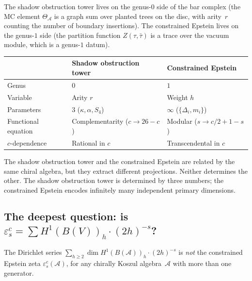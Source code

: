 \documentclass[11pt]{article}
\newcommand{\cA}{\mathcal{A}}
\begin{document}
The shadow obstruction tower lives on the genus-$0$ side of the bar complex
(the MC element $\Theta_\cA$ is a graph sum over planted trees
on the disc, with arity~$r$ counting the number of boundary
insertions).  The constrained Epstein lives on the genus-$1$
side (the partition function $Z(\tau,\bar\tau)$ is a trace over
the vacuum module, which is a genus-$1$ datum).

\begin{center}
\small
\renewcommand{\arraystretch}{1.2}
\begin{tabular}{@{}lll@{}}
& \textbf{Shadow obstruction tower} & \textbf{Constrained Epstein} \\
\hline
Genus & $0$ & $1$ \\
Variable & Arity $r$ & Weight $h$ \\
Parameters & $3$ ($\kappa, \alpha, S_4$) & $\infty$ ($\{\Delta_i, m_i\}$) \\
Functional equation & Complementarity ($c \to 26-c$) & Modular ($s \to c/2+1-s$) \\
$c$-dependence & Rational in $c$ & Transcendental in $c$
\end{tabular}
\end{center}

The shadow obstruction tower and the constrained Epstein are related by the
same chiral algebra, but they extract different projections.
Neither determines the other.  The shadow obstruction tower is
determined by three numbers; the constrained Epstein encodes
infinitely many independent primary dimensions.

\subsection{The deepest question: is $\varepsilon^c_s
= \sum H^1(B(V))_h \cdot (2h)^{-s}$?}

\begin{proposition}
\label{prop:bar-neq-quasiprimary}
The Dirichlet series
$\sum_{h \geq 2} \dim H^1(B(\cA))_h \cdot (2h)^{-s}$
is \emph{not} the constrained Epstein zeta
$\varepsilon^c_s(\cA)$, for any chirally Koszul
algebra~$\cA$ with more than one generator.
\end{proposition}
\end{document}
